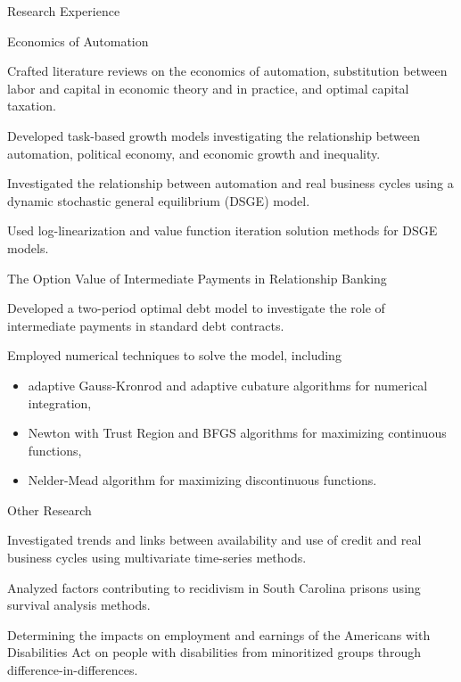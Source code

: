 \documentclass{resume} %
\begin{document}
\begin{rSection}{Research Experience}
    \begin{rSubsection}{Economics of Automation}{}{}{}
        \item Crafted literature reviews on the economics of automation, substitution between labor and capital in economic theory and in practice, and optimal capital taxation.
        \item Developed task-based growth models investigating the relationship between automation, political economy, and economic growth and inequality.
        \item Investigated the relationship between automation and real business cycles using a dynamic stochastic general equilibrium (DSGE) model.
        \item Used log-linearization and value function iteration solution methods for DSGE models.
    \end{rSubsection}

    \begin{rSubsection}{The Option Value of Intermediate Payments in Relationship Banking}{}{}{}
        \item Developed a two-period optimal debt model to investigate the role of intermediate payments in standard debt contracts.
        \item Employed numerical techniques to solve the model, including 
        \begin{itemize}
            \item adaptive Gauss-Kronrod and adaptive cubature algorithms for numerical integration,
            \item Newton with Trust Region and BFGS algorithms for maximizing continuous functions,
            \item Nelder-Mead algorithm for maximizing discontinuous functions.
        \end{itemize}
    \end{rSubsection}

    \begin{rSubsection}{Other Research}{}{}{}
        \item Investigated trends and links between availability and use of credit and real business cycles using multivariate time-series methods.
        \item Analyzed factors contributing to recidivism in South Carolina prisons using survival analysis methods.
        \item Determining the impacts on employment and earnings of the Americans with Disabilities Act on people with disabilities from minoritized groups through difference-in-differences.
    \end{rSubsection}
\end{rSection}
\end{document}
